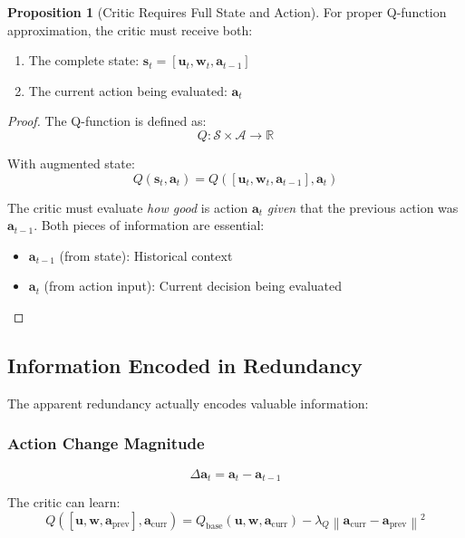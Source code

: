 \documentclass[11pt,a4paper]{article}
\newcommand{\R}{\mathbb{R}}
\newcommand{\norm}[1]{\left\|#1\right\|}
\theoremstyle{definition}
\newtheorem{proposition}{Proposition}
\begin{document}
\begin{proposition}[Critic Requires Full State and Action]
For proper Q-function approximation, the critic must receive both:
\begin{enumerate}
    \item The complete state: $\mathbf{s}_t = [\mathbf{u}_t, \mathbf{w}_t, \mathbf{a}_{t-1}]$
    \item The current action being evaluated: $\mathbf{a}_t$
\end{enumerate}
\end{proposition}

\begin{proof}
The Q-function is defined as:
\begin{equation}
    Q: \mathcal{S} \times \mathcal{A} \to \R
\end{equation}

With augmented state:
\begin{equation}
    Q(\mathbf{s}_t, \mathbf{a}_t) = Q([\mathbf{u}_t, \mathbf{w}_t, \mathbf{a}_{t-1}], \mathbf{a}_t)
\end{equation}

The critic must evaluate \emph{how good} is action $\mathbf{a}_t$ \emph{given} that the previous action was $\mathbf{a}_{t-1}$. Both pieces of information are essential:
\begin{itemize}
    \item $\mathbf{a}_{t-1}$ (from state): Historical context
    \item $\mathbf{a}_t$ (from action input): Current decision being evaluated
\end{itemize}
\end{proof}

\subsection{Information Encoded in Redundancy}

The apparent redundancy actually encodes valuable information:

\subsubsection{Action Change Magnitude}
\begin{equation}
    \Delta \mathbf{a}_t = \mathbf{a}_t - \mathbf{a}_{t-1}
\end{equation}

The critic can learn:
\begin{equation}
    Q([\mathbf{u}, \mathbf{w}, \mathbf{a}_{\text{prev}}], \mathbf{a}_{\text{curr}}) = Q_{\text{base}}(\mathbf{u}, \mathbf{w}, \mathbf{a}_{\text{curr}}) - \lambda_Q \norm{\mathbf{a}_{\text{curr}} - \mathbf{a}_{\text{prev}}}^2
\end{equation}
\end{document}
